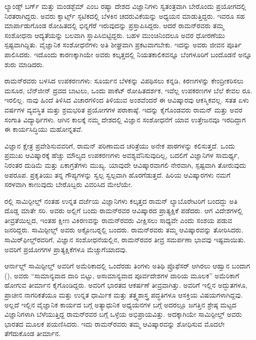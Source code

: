 ಲ್ಯಾಂಡ್ಸ್ ಬರ್ಗ್ ಮತ್ತು ಮಂಡಶ್ಬೆಮ್ ಎಂಬ ರಷ್ಯಾ ದೇಶದ ವಿಜ್ಞಾನಿಗಳು ಸ್ವತಂತ್ರವಾಗಿ ಬೇರೊಂದು ಪ್ರಯೋಗದಲ್ಲಿ ನಿರತರಾಗಿದ್ದರು. ಅವರು ಕ್ವಾರ್ಟ್ಸ್ ಸ್ಫಟಿಕದಲ್ಲಿ ಬೆಳಕಿನ ಚದರುವಿಕೆಯನ್ನು ಅಧ್ಯಯನ ಮಾಡುತ್ತಿದ್ದರು. ಇವರೂ ಸಹ ಮಾರ್ಪಾಡುಗೊಂಡ ರೋಹಿತದಲ್ಲಿ ಭಿನ್ನಗೆರೆ ಇರುವುದನ್ನು ಪ್ರಸ್ತಾಪಿಸಿದ್ದರು. ಆದರೆ ರಾಮನ್‍ರವರು ತಮ್ಮ ಸಂಶೋಧನಾ ಆದ್ಯತೆಯನ್ನು ಬಲವಾಗಿ ಸ್ಥಾಪಿಸಿಬಿಟ್ಟಿದ್ದರು. ಬಹಳ ಮುಂಚಿನಿಂದಲೂ ಅವರ ಧೋರಣೆಯು ಸ್ಪಷ್ಟವಾಗಿದ್ದಿತು. ವೈಜ್ಞಾನಿಕ ಸಂಶೋಧನೆಗಳು ಅತಿ ಶೀಘ್ರವಾಗಿ ಪ್ರಕಟವಾಗಬೇಕು. ಇದನ್ನು ಅವರು ಜೀವನ ಪೂರ್ತಿ ಪಾಲಿಸಿದರು. ಇದೊಂದು ಕಾರಣಕ್ಕಾಗಿಯೇ ಅವರು ಕಲ್ಕತ್ತದಲ್ಲಿ \textit{} ನಿಯತಕಾಲಿಕವನ್ನೂ ಬೆಂಗಳೂರಿಗೆ ಬಂದೊಡನೆ \textit{} ಅನ್ನೂ ಶುರು ಮಾಡಿದರು.

ರಾಮನ್‍ರವರು ಬಳಸಿದ ಉಪಕರಣಗಳು: ಸೂರ್ಯನ ಬೆಳಕನ್ನು ವಿಪಥಿಸಲು ಕನ್ನಡಿ, ಕಿರಣಗಳನ್ನು ಕೇಂದ್ರೀಕರಿಸಲು ಮಸೂರ, ಬೆನ್‍ಜೀನ್ ದ್ರವದ ಬಾಟಲು, ಒಂದು ಪಾಕೆಟ್ ರೋಹಿತದರ್ಶಕ, ಇವೆಲ್ಲ ಉಪಕರಣಗಳ ಬೆಲೆ ಕೇವಲ ರೂ. ಇರಲಿಲ್ಲ. ನಾವು ಹಿಂದೆ ತಿಳಿಸಿದ ವಿಚಾರಗಳಿಂದ ತಿಳಿಯುವ ಅಂಶವೆಂದರೆ ಈ ಆವಿಷ್ಕಾರವು ಆಕಸ್ಮಿಕವಲ್ಲ. ಸತತ ಏಳು ವರ್ಷಗಳ ವ್ಯವಸ್ಥಿತ ಮತ್ತು ಶ್ರಮಭರಿತ ಪ್ರಯೋಗಗಳ ಪರಾಕಾಷ್ಠೆ. ಇದನ್ನು ಕೈಗೊಂಡವರು ರಾಮನ್ ಮತ್ತು ಅವರ ಸಂಗಾತಿ ವಿದ್ಯಾರ್ಥಿಗಳು. ಆಗಿನ ಕಾಲಕ್ಕೆ ನಮ್ಮ ದೇಶದಲ್ಲಿ ವಿಜ್ಞಾನ ಸಂಶೋಧನೆಗೆ ಯಾವ ಉತ್ತೇಜನವೂ ಇರದಿದ್ದಾಗ ಈ ಕಾರ್ಯಸಿದ್ಧಿಯು ಮಹೋನ್ನತವೆ.

ವಿಜ್ಞಾನ ಕ್ಷೇತ್ರ ಪ್ರವೇಶಿಸುವವರಿಗೆ, ರಾಮನ್ ಪರಿಣಾಮದ ಚರಿತ್ರೆಯು ಅನೇಕ ಪಾಠಗಳನ್ನು ಕಲಿಸುತ್ತದೆ. ಒಂದು ಪ್ರಮುಖ ಆವಿಷ್ಕಾರಕ್ಕೆ ಹೆಚ್ಚು ಮೌಲ್ಯದ ಉಪಕರಣಗಳು ಅವಶ್ಯವೆನಿಸುವುದಿಲ್ಲ, ಬದಲಿಗೆ ವಿಜ್ಞಾನಿಗಳ ಸಾಮರ್ಥ್ಯ, ನಿರಂತರ ದುಡಿಮೆ ಮತ್ತು ಏಕಾಗ್ರತೆಗಳು ಮುಖ್ಯ. ಯಾವುದೇ ಆವಿಷ್ಕಾರವಾಗಲಿ ನೇರವಾಗಿ, ಸ್ಪಷ್ಟವಾಗಿ ತೋರುವುದು ಅಪರೂಪ. ಪ್ರಕೃತಿಯು ತನ್ನ ಗೌಪ್ಯಗಳನ್ನು ಸ್ವಲ್ಪ ಸ್ವಲ್ಪವಾಗಿ ಹೊರಗೆಡುತ್ತದೆ. ಹಿರಿಯ ಆವಿಷ್ಕಾರಗಳು ನಮಗೆ ಸರಳವಾಗಿ ಕಾಣುವುದು ಬೇರೊಬ್ಬರು ವಿವರಿಸಿದ ಮೇಲೆಯೇ.



ರಲ್ಲಿ ಸಾಮಿರ್‍ಫೀಲ್ಡ್ ನಂತಹ ಉನ್ನತ ದರ್ಜೆಯ ವಿಜ್ಞಾನಿಗಳು ಕಲ್ಕತ್ತದ ರಾಮನ್ ಲ್ಯಾಬೊರೇಟರಿಗೆ ಬಂದದ್ದು ಅತಿ ದೊಡ್ಡ ಮಾತೇ ಸರಿ. ಅವರು ಅಲ್ಲಿಗೆ ಬಂದು ರಾಮನ್‍ರವರ ಆವಿಷ್ಕಾರದ ಪ್ರಾತ್ಯಕ್ಷಿಕೆ ಪಡೆದರು. ಆಗ ವಿದೇಶಗಳಲ್ಲಿ ತೀವ್ರತೆಯಿಲ್ಲದ, ಇಂತಹ ಕ್ಷೀಣ ವಿಕಿರಣವನ್ನು ರಾಮನ್‍ರವರು ವೀಕ್ಷಿಸಲು ಸಾಧ್ಯವೇ ಎಂದು ಸಂಶಯ ಪಡುವ ಜನರಿದ್ದರು. ಸಾಮಿರ್‍ಫೀಲ್ಡ್ ಅವರು  ಅಕ್ಟೋಬರ್‍ನಲ್ಲಿ ಬಂದರು. ರಾಮನ್‍ರವರು ತಮ್ಮ ಆವಿಷ್ಕಾರವನ್ನು ತೋರಿಸಿದರು. ಸಾಮಿರ್‌ಫೀಲ್ಡ್‌ರವರಿಗೆ, ವಿಜ್ಞಾನ ಸಂಶೋಧನೆಯಲ್ಲಿನ, ರಾಮನ್‍ರವರ ತೀವ್ರ ಸಮರ್ಪಣಾ ಭಾವವು ಇಷ್ಟವಾಯಿತು. ಅವರಿಗೆ ಪ್ರಯೋಗಗಳ ಪ್ರಾತ್ಯಕ್ಷಿಕೆಗಳೂ ಮೆಚ್ಚುಗೆಯಾದವು.

\vskip 2.5pt

ಆರ್ನಾಲ್ಡ್ ಸಾಮಿರ್‍ಫೀಲ್ಡ್ ಅವರಿಗೆ ಅಮೆರಿಕಾದಲ್ಲಿ ಒಂದೆರಡು ತಿಂಗಳು ಅತಿಥಿ ಪ್ರೊಫೆಸರ್ ಆಗಿರಲು ಆಹ್ವಾನ ಬಂದಾಗ (), ಅವರು “ಸಾಮಾನ್ಯವಾದ ದಾರಿ ಬಿಟ್ಟು, ಅಸಾಮಾನ್ಯವಾದ ಪೂರ್ವದೇಶಗಳ ದಾರಿಯ ಮೂಲಕ” ಅಮೆರಿಕಾಗೆ ಹೋಗುವ ತೀರ್ಮಾನ ಕೈಗೊಂಡಿದ್ದರು. ಅವರಿಗೆ ಭಾರತದ ಆಕರ್ಷಣೆ ತೀವ್ರವಾಗಿತ್ತು. ಅವರಿಗೆ ಇಲ್ಲಿನ ಅದ್ಭುತಗಳೂ, ಪ್ರಾಚೀನ ನಾಗರಿಕತೆಯೂ ಮತ್ತು ಉನ್ನತ ಧಾರ್ಮಿಕ ಮತ್ತು ತತ್ತ್ವಶಾಸ್ತ್ರ ಪದ್ಧತಿಗಳೂ ಆಸಕ್ತಿಯ ವಿಷಯಗಳಾಗಿದ್ದವು. ಅಲ್ಲದೆ ಇಲ್ಲಿನ ವೈಜ್ಞಾನಿಕ ಕಾರ್ಯದ ಬಗ್ಗೆ ಅತ್ಯಾಧುನಿಕ ಅಧ್ಯಯನಗಳ ಬಗ್ಗೆ ಅದರಲ್ಲೂ ಜಗತ್ತಿನ ಶ್ರೇಷ್ಠ ಮಟ್ಟದ ವಿಜ್ಞಾನಿಗಳಾಗಿ ಬೆಳೆಯುತ್ತಿದ್ದ ರಾಮನ್‍ರವರ ಬಗ್ಗೆ ಒಳ್ಳೆಯ ಅಭಿಪ್ರಾಯವಿತ್ತು. ಅದಕ್ಕಾಗಿಯೇ ಸಾಮಿರ್‍ಫೀಲ್ಡ್ ಅವರು ಭಾರತದ ಮೂಲಕ ಪಯಣಿಸಿದರು. ಇದು ರಾಮನ್‍ರವರು ತಮ್ಮ ಆವಿಷ್ಕಾರವನ್ನು ಶೋಧಿಸುವ ಮೊದಲೇ ತೆಗೆದುಕೊಂಡ ತೀರ್ಮಾನ.

